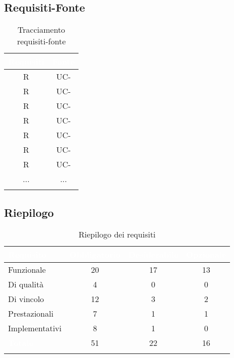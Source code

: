 \subsection{Requisiti-Fonte}
\renewcommand{\arraystretch}{1.5}
\begin{xltabular}{\textwidth}{|c | c |}
    \hline
     \textbf{\textcolor{white}{Requisiti}} & \textbf{\textcolor{white}{Fonte}}\\
    \hline
    \endhead
    R & UC- \\
    \hline
    R & UC- \\
    \hline
    R & UC-\\
    \hline
    R & UC-\\
    \hline
    R & UC-\\
    \hline
    R & UC-\\
    \hline
    R& UC-\\
    \hline
    ... & ... \\
    \hline
     \caption{Tracciamento requisiti-fonte}
    \label{tab:riepilogo}
\end{xltabular}

\subsection{Riepilogo}
\begingroup
\setlength{\tabcolsep}{10pt}
\renewcommand{\arraystretch}{1.5}
\begin{xltabular}{\textwidth}{| X | c | c | c |}
    \hline
     \textbf{\textcolor{white}{Requisito}} & \textbf{\textcolor{white}{Obbligatorio}} & \textbf{\textcolor{white}{Desiderabile}} & \textbf{\textcolor{white}{Opzionale}}\\
    \hline
    \endhead
    Funzionale & 20 & 17 & 13 \\
    \hline
    Di qualità & 4 & 0 & 0 \\
    \hline
    Di vincolo & 12 & 3 & 2 \\
    \hline
    Prestazionali & 7 & 1 & 1 \\
    \hline
    Implementativi & 8 & 1 & 0 \\
    \hline
     \textbf{\textcolor{white}{Totale}} & 51 & 22 & 16 \\
    \hline
     \caption{Riepilogo dei requisiti}
    \label{tab:riepilogo}
\end{xltabular}
\endgroup



